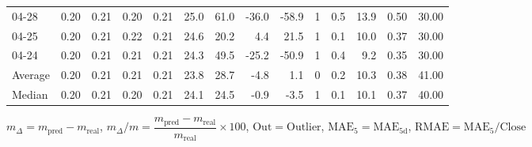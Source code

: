 \begin{threeparttable}
{\begin{tabular}{lrrrrrrrrrrrrr}
  04-28 &          0.20 &          0.21 &          0.20 &        0.21 &                25.0 &                61.0 &      -36.0 &        -58.9 &              1 &                 0.5 &             13.9 &            0.50 &                  30.00 \\
  04-25 &          0.20 &          0.21 &          0.22 &        0.21 &                24.6 &                20.2 &        4.4 &         21.5 &              1 &                 0.1 &             10.0 &            0.37 &                  30.00 \\
  04-24 &          0.20 &          0.21 &          0.21 &        0.21 &                24.3 &                49.5 &      -25.2 &        -50.9 &              1 &                 0.4 &              9.2 &            0.35 &                  30.00 \\
Average &          0.20 &          0.21 &          0.21 &        0.21 &                23.8 &                28.7 &       -4.8 &          1.1 &              0 &                 0.2 &             10.3 &            0.38 &                  41.00 \\
 Median &          0.20 &          0.21 &          0.20 &        0.21 &                24.1 &                24.5 &       -0.9 &         -3.5 &              1 &                 0.1 &             10.1 &            0.37 &                  40.00 \\
\bottomrule
\end{tabular}
}
\begin{tablenotes}\footnotesize
\item $m_\Delta=m_{\text{pred}}-m_{\text{real}}$,
$m_\Delta/m=\dfrac{m_{\text{pred}}-m_{\text{real}}}{m_{\text{real}}}\times100$,
$\mathrm{Out}=\text{Outlier}$,
$\mathrm{MAE}_5=\mathrm{MAE}_{5\text{d}}$,
$\mathrm{RMAE}=\mathrm{MAE}_5/\text{Close}$
\end{tablenotes}
\end{threeparttable}
\endgroup

